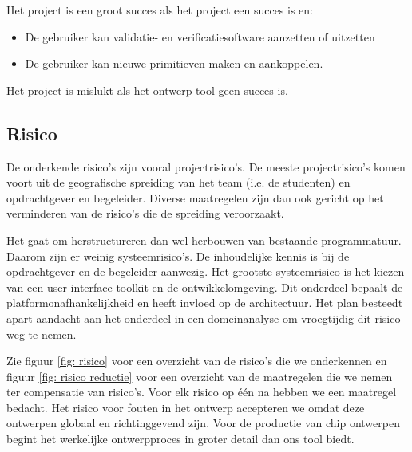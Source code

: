 Het project is een groot succes als het project een succes is en:

\begin{itemize}
 \item De gebruiker kan validatie- en verificatiesoftware aanzetten of uitzetten
 \item De gebruiker kan nieuwe primitieven maken en aankoppelen.
\end{itemize}

Het project is mislukt als het ontwerp tool geen succes is.

\subsection{Risico}

De onderkende risico's zijn vooral projectrisico's. De meeste projectrisico's komen voort uit de
geografische spreiding van het team (i.e. de studenten) en opdrachtgever
en begeleider. Diverse maatregelen zijn dan ook gericht op het verminderen
van de risico's die de spreiding veroorzaakt.

Het gaat om herstructureren dan wel herbouwen van bestaande programmatuur. Daarom zijn er weinig systeemrisico's.
De inhoudelijke kennis is bij de opdrachtgever en de begeleider aanwezig. Het grootste systeemrisico is het kiezen
van een user interface toolkit en de ontwikkelomgeving. Dit onderdeel bepaalt de platformonafhankelijkheid
en heeft invloed op de architectuur. Het plan besteedt apart aandacht aan het onderdeel in een domeinanalyse om
vroegtijdig dit risico weg te nemen.

Zie figuur \ref{fig: risico} voor een overzicht van de risico's die we onderkennen en figuur \ref{fig: risico reductie} voor
een overzicht van de maatregelen die we nemen ter compensatie van risico's. Voor elk risico op \'e\'en na hebben we een
maatregel bedacht. Het risico voor fouten in het ontwerp accepteren we omdat deze ontwerpen globaal en richtinggevend zijn.
Voor de productie van chip ontwerpen begint het werkelijke ontwerpproces in groter detail dan ons tool biedt.

